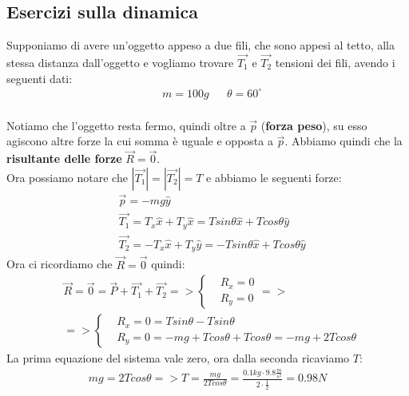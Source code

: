   \subsection{Esercizi sulla dinamica}
    Supponiamo di avere un'oggetto appeso a due fili, che sono appesi al tetto, alla stessa distanza dall'oggetto e vogliamo trovare $\vec{T_1}$ e $\vec{T_2}$ tensioni dei fili, avendo i seguenti dati:
    \begin{align*}
      &m=100g&&\theta=60^{\circ}\\
    \end{align*}


    Notiamo che l'oggetto resta fermo, quindi oltre a $\vec{p}$ (\textbf{forza peso}), su esso agiscono altre forze la cui somma è uguale e opposta a $\vec{p}$. Abbiamo quindi che la \textbf{risultante delle forze} $\vec{R}=\vec{0}$.\\
    Ora possiamo notare che $|\vec{T_1}|=|\vec{T_2}|=T$ e abbiamo le seguenti forze:
    \begin{align*}
      &\vec{p}=-mg\hat{y}\\
      &\vec{T_1}=T_x\hat{x}+T_y\hat{x}=Tsin\theta \hat{x}+Tcos\theta \hat{y}\\
      &\vec{T_2}=-T_x\hat{x}+T_y\hat{y}=-Tsin\theta \hat{x}+Tcos\theta \hat{y}
    \end{align*}
    Ora ci ricordiamo che $\vec{R}=\vec{0}$ quindi:
    \begin{align*}
      &\vec{R}=\vec{0}=\vec{P}+\vec{T_1}+\vec{T_2}=>
      \begin{cases}
        &R_x=0\\
        &R_y=0
      \end{cases}=>\\
      &=>\begin{cases}
        &R_x=0=Tsin\theta-Tsin\theta\\
        &R_y=0=-mg+Tcos\theta+Tcos\theta=-mg+2Tcos\theta
      \end{cases}
    \end{align*}
    La prima equazione del sistema vale zero, ora dalla seconda ricaviamo $T$:
    \begin{align*}
    mg=2Tcos\theta=>T=\frac{mg}{2Tcos\theta}=\frac{0.1kg\cdot 9.8\frac{m}{s^2}}{2\cdot\frac{1}{2}}=0.98N
    \end{align*}
